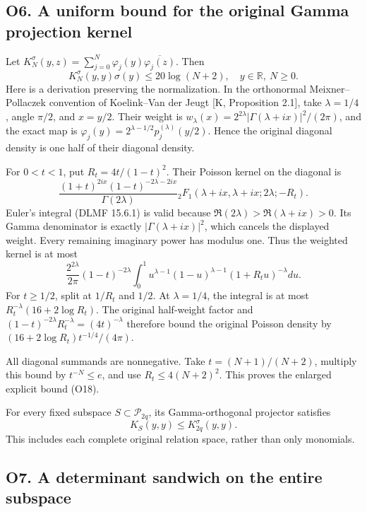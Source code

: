 \documentclass[11pt,a4paper]{article}
\begin{document}
\subsection{O6. A uniform bound for the original Gamma projection
kernel}\label{sa:o6.-a-uniform-bound-for-the-original-gamma-projection-kernel}

Let \(K_N^\sigma(y,z)=\sum_{j=0}^N\varphi_j(y)\overline{\varphi_j(z)}\).
Then \[
\boxed{K_N^\sigma(y,y)\sigma(y)\le20\log(N+2),
\quad y\in\mathbb R,\ N\ge0.}\tag{O18}
\] Here is a derivation preserving the normalization. In the orthonormal
Meixner--Pollaczek convention of Koelink--Van der Jeugt {[}K,
Proposition 2.1{]}, take \(\lambda=1/4\), angle \(\pi/2\), and
\(x=y/2\). Their weight is
\(w_\lambda(x)=2^{2\lambda}|\Gamma(\lambda+ix)|^2/(2\pi)\), and the
exact map is \(\varphi_j(y)=2^{\lambda-1/2}p_j^{(\lambda)}(y/2)\). Hence
the original diagonal density is one half of their diagonal density.

For \(0<t<1\), put \(R_t=4t/(1-t)^2\). Their Poisson kernel on the
diagonal is \[
\frac{(1+t)^{2ix}(1-t)^{-2\lambda-2ix}}{\Gamma(2\lambda)}
{}_2F_1(\lambda+ix,\lambda+ix;2\lambda;-R_t).
\] Euler's integral (DLMF 15.6.1) is valid because
\(\Re(2\lambda)>\Re(\lambda+ix)>0\). Its Gamma denominator is exactly
\(|\Gamma(\lambda+ix)|^2\), which cancels the displayed weight. Every
remaining imaginary power has modulus one. Thus the weighted kernel is
at most \[
\frac{2^{2\lambda}}{2\pi}(1-t)^{-2\lambda}
\int_0^1u^{\lambda-1}(1-u)^{\lambda-1}(1+R_tu)^{-\lambda}du.
\] For \(t\ge1/2\), split at \(1/R_t\) and \(1/2\). At \(\lambda=1/4\),
the integral is at most \(R_t^{-\lambda}(16+2\log R_t)\). The original
half-weight factor and
\((1-t)^{-2\lambda}R_t^{-\lambda}=(4t)^{-\lambda}\) therefore bound the
original Poisson density by \((16+2\log R_t)t^{-1/4}/(4\pi)\).

All diagonal summands are nonnegative. Take \(t=(N+1)/(N+2)\), multiply
this bound by \(t^{-N}\le e\), and use \(R_t\le4(N+2)^2\). This proves
the enlarged explicit bound (O18).

For every fixed subspace \(S\subset\mathcal P_{2q}\), its
Gamma-orthogonal projector satisfies \[
K_S(y,y)\le K_{2q}^\sigma(y,y).\tag{O19}
\] This includes each complete original relation space, rather than only
monomials.

\subsection{O7. A determinant sandwich on the entire
subspace}\label{sa:o7.-a-determinant-sandwich-on-the-entire-subspace}
\end{document}
